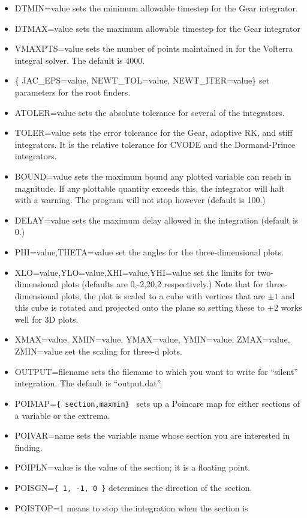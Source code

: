 \documentclass{article}
\begin{document}
\begin{itemize}
\item DTMIN=value sets the minimum allowable timestep for the Gear
integrator.
\item DTMAX=value sets the maximum allowable timestep for the Gear
integrator
\item VMAXPTS=value sets the number of points maintained in for the
Volterra integral solver. The default is 4000.
\item \{ JAC\_EPS=value, NEWT\_TOL=value, NEWT\_ITER=value\} set
parameters for the root finders.
\item ATOLER=value sets the absolute tolerance for several of the
integrators.
\item TOLER=value sets the error tolerance for the Gear, adaptive RK,
and stiff integrators. It is the relative tolerance for CVODE and the
Dormand-Prince integrators.
\item BOUND=value sets the maximum bound any plotted variable can
reach in magnitude. If any plottable quantity exceeds this, the
integrator will halt with a warning.  The program will not stop
however (default is 100.)
\item DELAY=value sets the maximum delay allowed in the integration
(default is 0.)
\item PHI=value,THETA=value set the angles for the three-dimensional
plots.
\item XLO=value,YLO=value,XHI=value,YHI=value set the limits for
two-dimensional plots (defaults are 0,-2,20,2 respectively.) Note that
for three-dimensional plots, the plot is scaled to a cube with
vertices that are $\pm1$ and this cube is rotated and projected onto
the plane so setting these to $\pm2$ works well for 3D plots.
\item
XMAX=value, XMIN=value, YMAX=value, YMIN=value, ZMAX=value, ZMIN=value set
the scaling for three-d plots.
\item OUTPUT=filename sets the filename to which you want to write for
``silent'' integration.  The default is ``output.dat''.
\item POIMAP={\tt \{ section,maxmin\} } sets up a Poincare map for
either sections of a variable or the extrema.
\item POIVAR=name sets the variable name whose section you are
interested in finding.
\item POIPLN=value is the value of the section; it is a floating
point.
\item POISGN={\tt \{ 1, -1, 0 \}} determines the direction of the
section.
\item POISTOP=1 means to stop the integration when the section is

\end{itemize}
\end{document}
